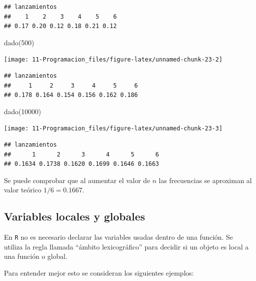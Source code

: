 \documentclass[
]{book}
\newenvironment{Shaded}{\begin{snugshade}}{\end{snugshade}}
\newcommand{\DecValTok}[1]{\textcolor[rgb]{0.00,0.00,0.81}{#1}}
\newcommand{\FunctionTok}[1]{\textcolor[rgb]{0.00,0.00,0.00}{#1}}
\newcommand{\NormalTok}[1]{#1}
\theoremstyle{break}
\begin{document}
\begin{verbatim}
## lanzamientos
##    1    2    3    4    5    6 
## 0.17 0.20 0.12 0.18 0.21 0.12
\end{verbatim}

\begin{Shaded}
\begin{Highlighting}[]
\FunctionTok{dado}\NormalTok{(}\DecValTok{500}\NormalTok{)}
\end{Highlighting}
\end{Shaded}

\begin{center}\texttt{[image: 11-Programacion\_files/figure-latex/unnamed-chunk-23-2]} \end{center}

\begin{verbatim}
## lanzamientos
##     1     2     3     4     5     6 
## 0.178 0.164 0.154 0.156 0.162 0.186
\end{verbatim}

\begin{Shaded}
\begin{Highlighting}[]
\FunctionTok{dado}\NormalTok{(}\DecValTok{10000}\NormalTok{)}
\end{Highlighting}
\end{Shaded}

\begin{center}\texttt{[image: 11-Programacion\_files/figure-latex/unnamed-chunk-23-3]} \end{center}

\begin{verbatim}
## lanzamientos
##      1      2      3      4      5      6 
## 0.1634 0.1738 0.1620 0.1699 0.1646 0.1663
\end{verbatim}

Se puede comprobar que al aumentar el valor de \(n\) las frecuencias se
aproximan al valor teórico \(1/6=0.1667\).

\hypertarget{variables-locales-y-globales}{%
\subsection{Variables locales y globales}\label{variables-locales-y-globales}}

En \texttt{R} no es
necesario declarar las variables usadas dentro de una función. Se
utiliza la regla llamada ``ámbito lexicográfico'' para decidir si un
objeto es local a una función o global.

Para entender mejor esto se consideran los siguientes ejemplos:
\end{document}
